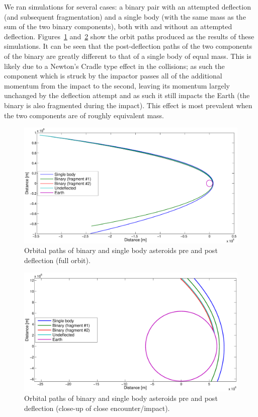 \documentclass[letterpaper, preprint, paper,11pt]{AAS}	%
\begin{document}
We ran simulations for several cases: a binary pair with an attempted deflection (and subsequent fragmentation) and a single body (with the same mass as the sum of the two binary components), both with and without an attempted deflection. Figures~\ref{fig:bouncey} and~\ref{fig:bouncey_zoom} show the orbit paths produced as the results of these simulations. It can be seen that the post-deflection paths of the two components of the binary are greatly different to that of a single body of equal mass. This is likely due to a Newton's Cradle type effect in the collisions; as such the component which is struck by the impactor passes all of the additional momentum from the impact to the second, leaving its momentum largely unchanged by the deflection attempt and as such it still impacts the Earth (the binary is also fragmented during the impact). This effect is most prevalent when the two components are of roughly equivalent mass.
\begin{figure}
\centering
\centerline{\includegraphics[width=1.1\textwidth]{deflection_1.eps}}
\caption{Orbital paths of binary and single body asteroids pre and post deflection (full orbit).} 
\label{fig:bouncey}
\end{figure} 
\begin{figure}
\centering
\centerline{\includegraphics[width=1.1\textwidth]{deflection_0.eps}} 
\caption{Orbital paths of binary and single body asteroids pre and post deflection (close-up of close encounter/impact).} 
\label{fig:bouncey_zoom}
\end{figure} 
\end{document}
